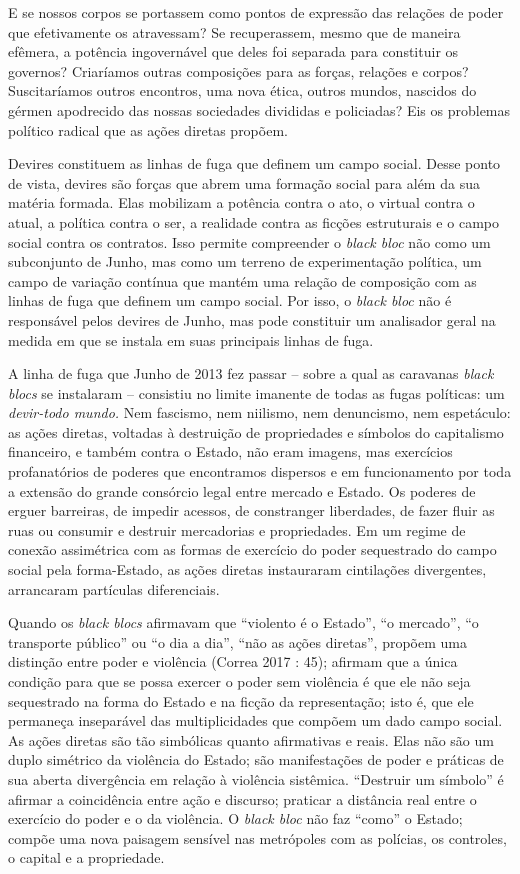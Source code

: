 E se nossos corpos se portassem como pontos de expressão das relações de
poder que efetivamente os atravessam? Se recuperassem, mesmo que de
maneira efêmera, a potência ingovernável que deles foi separada para
constituir os governos? Criaríamos outras composições para as forças,
relações e corpos? Suscitaríamos outros encontros, uma nova ética,
outros mundos, nascidos do gérmen apodrecido das nossas sociedades
divididas e policiadas? Eis os problemas político radical que as ações
diretas propõem.

Devires constituem as linhas de fuga que definem um campo social. Desse
ponto de vista, devires são forças que abrem uma formação social para
além da sua matéria formada. Elas mobilizam a potência contra o ato, o
virtual contra o atual, a política contra o ser, a realidade contra as
ficções estruturais e o campo social contra os contratos. Isso permite
compreender o \emph{black bloc }não como um subconjunto de Junho, mas
como um terreno de experimentação política, um campo de variação
contínua que mantém uma relação de composição com as linhas de fuga que
definem um campo social. Por isso, o \emph{black bloc }não é responsável
pelos devires de Junho, mas pode constituir um analisador geral na
medida em que se instala em suas principais linhas de fuga.

A linha de fuga que Junho de 2013 fez passar -- sobre a qual as
caravanas \emph{black blocs} se instalaram -- consistiu no limite
imanente de todas as fugas políticas: um \emph{devir-todo mundo.} Nem
fascismo, nem niilismo, nem denuncismo, nem espetáculo: as ações
diretas, voltadas à destruição de propriedades e símbolos do capitalismo
financeiro, e também contra o Estado, não eram imagens, mas exercícios
profanatórios de poderes que encontramos dispersos e em funcionamento
por toda a extensão do grande consórcio legal entre mercado e Estado. Os
poderes de erguer barreiras, de impedir acessos, de constranger
liberdades, de fazer fluir as ruas ou consumir e destruir mercadorias e
propriedades. Em um regime de conexão assimétrica com as formas de
exercício do poder sequestrado do campo social pela forma-Estado, as
ações diretas instauraram cintilações divergentes, arrancaram partículas
diferenciais.

Quando os \emph{black blocs} afirmavam que ``violento é o Estado'', ``o
mercado'', ``o transporte público'' ou ``o dia a dia'', ``não as ações
diretas'', propõem uma distinção entre poder e violência (Correa 2017 :
45); afirmam que a única condição para que se possa exercer o poder sem
violência é que ele não seja sequestrado na forma do Estado e na ficção
da representação; isto é, que ele permaneça inseparável das
multiplicidades que compõem um dado campo social. As ações diretas são
tão simbólicas quanto afirmativas e reais. Elas não são um duplo
simétrico da violência do Estado; são manifestações de poder e práticas
de sua aberta divergência em relação à violência sistêmica. ``Destruir
um símbolo'' é afirmar a coincidência entre ação e discurso; praticar a
distância real entre o exercício do poder e o da violência. O
\emph{black bloc} não faz ``como'' o Estado; compõe uma nova paisagem
sensível nas metrópoles com as polícias, os controles, o capital e a
propriedade.


